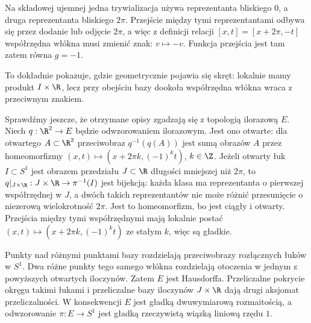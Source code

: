 \begin{przyklad}
Na składowej ujemnej jedna trywializacja używa reprezentanta bliskiego $0$,
a druga reprezentanta bliskiego $2\pi$.
Przejście między tymi reprezentantami odbywa się przez dodanie lub odjęcie
$2\pi$, a więc z definicji relacji
$
[x,t]=[x+2\pi,-t]
$
współrzędna włókna musi zmienić znak:
$
v\longmapsto -v.
$
Funkcja przejścia jest tam zatem równa
$
g=-1.
$

To dokładnie pokazuje, gdzie geometrycznie pojawia się skręt:
lokalnie mamy produkt $I\times\R$, lecz przy obejściu bazy dookoła
współrzędna włókna wraca z przeciwnym znakiem.

\medskip
Sprawdźmy jeszcze, że otrzymane opisy zgadzają się z topologią
ilorazową $E$. Niech $q:\R^2\to E$ będzie odwzorowaniem ilorazowym.
Jest ono otwarte: dla otwartego $A\subset\R^2$ przeciwobraz
$q^{-1}(q(A))$ jest sumą obrazów $A$ przez homeomorfizmy
$(x,t)\mapsto(x+2\pi k,(-1)^k t)$, $k\in\Z$.
Jeżeli otwarty łuk $I\subset S^1$ jest obrazem przedziału
$J\subset\R$ długości mniejszej niż $2\pi$, to
$q|_{J\times\R}:J\times\R\to\pi^{-1}(I)$ jest bijekcją:
każda klasa ma reprezentanta o pierwszej współrzędnej w $J$,
a dwóch takich reprezentantów nie może różnić przesunięcie
o niezerową wielokrotność $2\pi$. Jest to homeomorfizm,
bo jest ciągły i otwarty. Przejścia między tymi współrzędnymi
mają lokalnie postać
$(x,t)\mapsto(x+2\pi k,(-1)^k t)$ ze stałym $k$,
więc są gładkie.

Punkty nad różnymi punktami bazy rozdzielają przeciwobrazy
rozłącznych łuków w $S^1$. Dwa różne punkty tego samego
włókna rozdzielają otoczenia w jednym z powyższych
otwartych iloczynów. Zatem $E$ jest Hausdorffa.
Przeliczalne pokrycie okręgu takimi łukami i przeliczalne
bazy iloczynów $J\times\R$ dają drugi aksjomat
przeliczalności. W konsekwencji $E$ jest gładką
dwuwymiarową rozmaitością, a odwzorowanie
$
\pi\colon E\to S^1
$
jest gładką rzeczywistą wiązką liniową rzędu $1$.

\end{przyklad}

